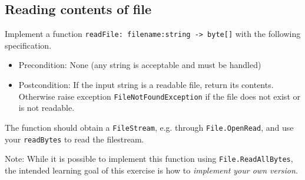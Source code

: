\subsection*{Reading contents of file}

Implement a function \texttt{readFile: filename:string -> byte[]} with the following specification. 
\begin{itemize}
\item Precondition: None (any string is acceptable and must be handled)
\item Postcondition: If the input string is a readable file, return its contents.  Otherwise raise exception \texttt{FileNotFoundException} if the file does not exist or is not readable.
\end{itemize}

The function should obtain a \texttt{FileStream}, e.g. through \texttt{File.OpenRead}, and use your \texttt{readBytes} to read the filestream.

Note: While it is possible to implement this function using \texttt{File.ReadAllBytes}, the intended learning goal of this exercise is how to \textit{implement your own version}.
